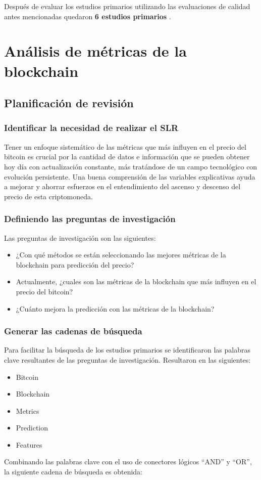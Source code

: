 Después de evaluar los estudios primarios utilizando las evaluaciones de calidad antes mencionadas quedaron \textbf{6 estudios primarios} \parencite{tandonBitcoinPriceForecasting2019,chenBitcoinPricePrediction2020,mudassirTimeseriesForecastingBitcoin2020,felizardoComparativeStudyBitcoin2019,mcnallyPredictingPriceBitcoin2018,phaladisailoedMachineLearningModels2018}.

\section{Análisis de métricas de la blockchain}
\subsection{Planificación de revisión}
\subsubsection{Identificar la necesidad de realizar el SLR}

Tener un enfoque sistemático de las métricas que más influyen en el precio del bitcoin es crucial por la cantidad de datos e información que se pueden obtener hoy día con actualización constante, más tratándose de un campo tecnológico con evolución persistente.
Una buena comprensión de las variables explicativas ayuda a mejorar y ahorrar esfuerzos en el entendimiento del ascenso y descenso del precio de esta criptomoneda.

\subsubsection{Definiendo las preguntas de investigación}
Las preguntas de investigación son las siguientes:
\begin{itemize}
	\item ¿Con qué métodos se están seleccionando las mejores métricas de la blockchain para predicción del precio?
	\item Actualmente, ¿cuales son las métricas de la blockchain que más influyen en el precio del bitcoin?
	\item ¿Cuánto mejora la predicción con las métricas de la blockchain?
\end{itemize}

\subsubsection{Generar las cadenas de búsqueda}
Para facilitar la búsqueda de los estudios primarios se identificaron las palabras clave resultantes de las preguntas de investigación. Resultaron en las siguientes:
\begin{itemize}
	\item Bitcoin
	\item Blockchain
	\item Metrics
	\item Prediction
	\item Features
\end{itemize}
Combinando las palabras clave con el uso de conectores lógicos “AND” y “OR”, la siguiente cadena de búsqueda es obtenida:\\

